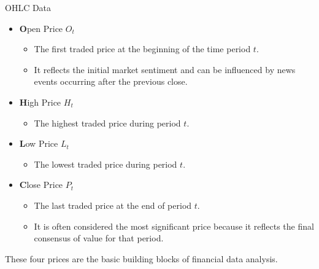 \documentclass[9pt, aspectratio=169, t]{beamer}
\theoremstyle{definition}
\begin{document}
\begin{frame}{OHLC Data}

\begin{itemize}
    \item \textbf{O}pen Price $O_t$
    \begin{itemize}
        \item The first traded price at the beginning of the time period $t$.
        \item It reflects the initial market sentiment and can be influenced by news events occurring after the previous close.
    \end{itemize}
    \item \textbf{H}igh Price $H_t$
    \begin{itemize}
        \item The highest traded price during period $t$.
    \end{itemize}
    \item \textbf{L}ow Price $L_t$
    \begin{itemize}
        \item The lowest traded price during period $t$.
    \end{itemize}
    \item \textbf{C}lose Price $P_t$
    \begin{itemize}
        \item The last traded price at the end of period $t$.
        \item It is often considered the most significant price because it reflects the final consensus of value for that period.
    \end{itemize}
\end{itemize}

\vspace{0.3cm}
These four prices are the basic building blocks of financial data analysis.

\end{frame}
\end{document}
